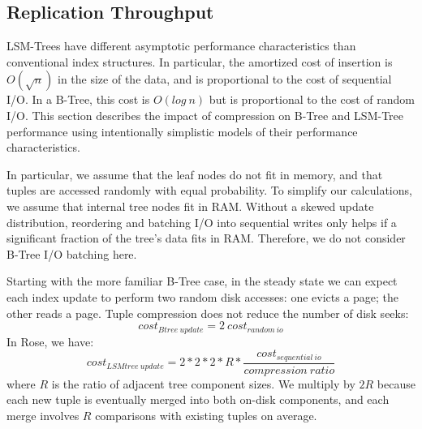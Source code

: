 \documentclass{vldb}
\newcommand{\rows}{Rose\xspace}
\begin{document}

\subsection{Replication Throughput}

LSM-Trees have different asymptotic performance characteristics than
conventional index structures.  In particular, the amortized cost of
insertion is $O(\sqrt{n})$ in the size of the data, and is proportional
 to the cost of sequential I/O.  In a B-Tree, this cost is
$O(log~n)$ but is proportional to the cost of random I/O.
This section describes the impact of compression on B-Tree
and LSM-Tree performance using intentionally simplistic models of
their performance characteristics.

In particular, we assume that the leaf nodes do not fit in memory, and
that tuples are accessed randomly with equal probability.  To simplify
our calculations, we assume that internal tree nodes fit in RAM.
Without a skewed update distribution, reordering and batching I/O into
sequential writes only helps if a significant fraction of the tree's
data fits in RAM.  Therefore, we do not consider B-Tree I/O batching here.

Starting with the more familiar B-Tree case, in the steady state we
can expect each index update to perform two random disk accesses: one
evicts a page; the other reads a page.  Tuple compression does not
reduce the number of disk seeks:
\[
   cost_{Btree~update}=2~cost_{random~io}
\]
In \rows, we have:
\[
   cost_{LSMtree~update}=2*2*2*R*\frac{cost_{sequential~io}}{compression~ratio}  %
\]
where $R$ is the ratio of adjacent tree component sizes.
We multiply by $2R$ because each new
tuple is eventually merged into both on-disk components, and
each merge involves $R$ comparisons with existing tuples on average.
\end{document}
